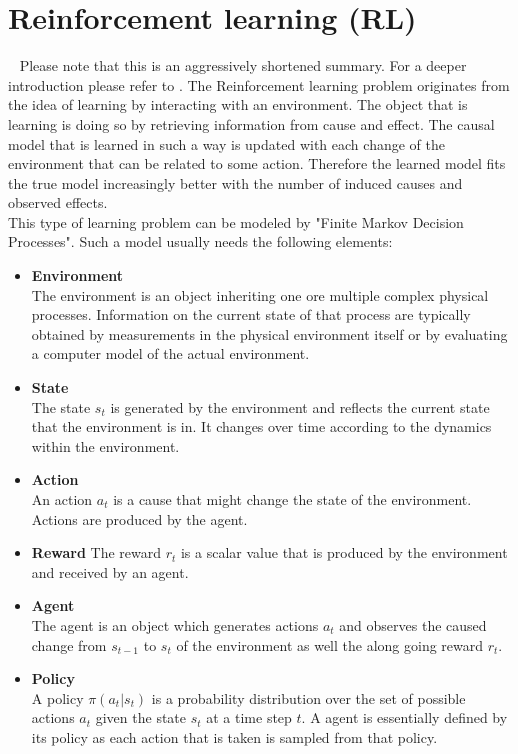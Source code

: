 \section{Reinforcement learning (RL)}~\label{ssec:rl}
\noindent Please note that this is an aggressively shortened summary. For a deeper introduction please refer to \cite{SB_all}.
The Reinforcement learning problem originates from the idea of learning by interacting with an environment. The object that is learning is doing so by retrieving information from cause and effect. The causal model that is learned in such a way is updated with each change of the environment that can be related to some action. Therefore the learned model fits the true model increasingly better with the number of induced causes and observed effects.\\
This type of learning problem can be modeled by "Finite Markov Decision Processes". Such a model usually needs the following elements:\\

\begin{itemize}
	\item \textbf{Environment}\\
	The environment is an object inheriting one ore multiple complex physical processes. Information on the current state of that process are typically obtained by measurements in the physical environment itself or by evaluating a computer model of the actual environment.
	\item \textbf{State}\\
	The state $s_t$ is generated by the environment and reflects the current state that the environment is in. It changes over time according to the dynamics within the environment.
	\item \textbf{Action}\\
	An action $a_t$ is a cause that might change the state of the environment. Actions are produced by the agent.
	\item \textbf{Reward} The reward $r_t$ is a scalar value that is produced by the environment and received by an agent.
	\item \textbf{Agent}\\
	The agent is an object which generates actions $a_t$ and observes the caused change from $s_{t-1}$ to $s_t$ of the environment as well the along going reward $r_t$.
	\item \textbf{Policy}\\
	A policy $\pi(a_t|s_t)$ is a probability distribution over the set of possible actions $a_t$ given the state $s_t$ at a time step $t$. A agent is essentially defined by its policy as each action that is taken is sampled from that policy.
\end{itemize}

